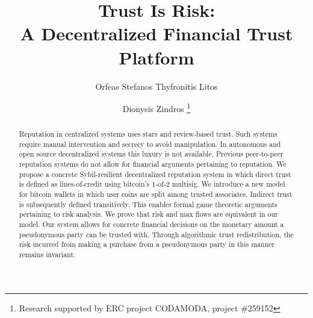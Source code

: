 \documentclass[11pt]{llncs}
\theoremstyle{definition}
\begin{document}
\title{Trust Is Risk: \\ A Decentralized Financial Trust Platform}
\author{Orfeas Stefanos Thyfronitis Litos \and Dionysis Zindros \fnmsep
                                               \thanks{Research supported by ERC project CODAMODA, project \#259152}}
\maketitle
\thispagestyle{plain}
  \begin{abstract}
     Reputation in centralized systems uses stars and review-based trust. Such systems require manual intervention and
     secrecy to avoid manipulation. In autonomous and open source decentralized systems this luxury is not available.
     Previous peer-to-peer reputation systems do not allow for financial arguments pertaining to reputation. We propose a
     concrete Sybil-resilient decentralized reputation system in which direct trust is defined as lines-of-credit using
     bitcoin's 1-of-2 multisig. We introduce a new model for bitcoin wallets in which user coins are split among trusted
     associates. Indirect trust is subsequently defined transitively. This enables formal game theoretic arguments pertaining
     to risk analysis. We prove that risk and max flows are equivalent in our model. Our system allows for concrete financial
     decisions on the monetary amount a pseudonymous party can be trusted with. Through algorithmic trust redistribution, the
     risk incurred from making a purchase from a pseudonymous party in this manner remains invariant.
  \end{abstract}
\end{document}
